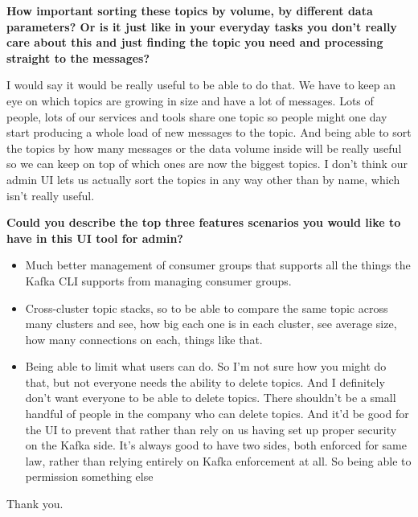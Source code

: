 \textbf{How important sorting these topics by volume, by different data parameters? Or is it just like in your everyday tasks you don't really care about this and just finding the topic you need and processing straight to the messages?} 

I would say it would be really useful to be able to do that. We have to keep an eye on which topics are growing in size and have a lot of messages. Lots of people, lots of our services and tools share one topic so people might one day start producing a whole load of new messages to the topic. And being able to sort the topics by how many messages or the data volume inside will be really useful so we can keep on top of which ones are now the biggest topics. I don't think our admin UI lets us actually sort the topics in any way other than by name, which isn't really useful. 

\textbf{Could you describe the top three features scenarios you would like to have in this UI tool for admin?
}

\begin{itemize}
\item Much better management of consumer groups that supports all the things the Kafka CLI supports from managing consumer groups. 
\item  Cross-cluster topic stacks, so to be able to compare the same topic across many clusters and see, how big each one is in each cluster, see average size, how many connections on each, things like that. 
\item Being able to limit what users can do. So I'm not sure how you might do that, but not everyone needs the ability to delete topics. And I definitely don't want everyone to be able to delete topics. There shouldn't be a small handful of people in the company who can delete topics. And it'd be good for the UI to prevent that rather than rely on us having set up proper security on the Kafka side. It's always good to have two sides, both enforced for same law, rather than relying entirely on Kafka enforcement at all. So being able to permission something else
\end{itemize}

Thank you.